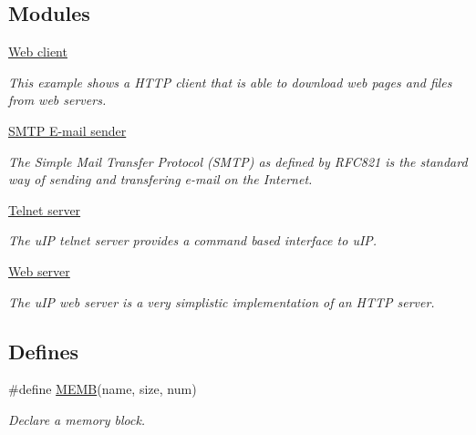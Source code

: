 \subsection*{Modules}
\begin{CompactItemize}
\item 
\hyperlink{a00079}{Web client}
\begin{CompactList}\small\item\em This example shows a HTTP client that is able to download web pages and files from web servers. \item\end{CompactList}

\item 
\hyperlink{a00080}{SMTP E-mail sender}
\begin{CompactList}\small\item\em The Simple Mail Transfer Protocol (SMTP) as defined by RFC821 is the standard way of sending and transfering e-mail on the Internet. \item\end{CompactList}

\item 
\hyperlink{a00081}{Telnet server}
\begin{CompactList}\small\item\em The u\-IP telnet server provides a command based interface to u\-IP. \item\end{CompactList}

\item 
\hyperlink{a00082}{Web server}
\begin{CompactList}\small\item\em The u\-IP web server is a very simplistic implementation of an HTTP server. \item\end{CompactList}

\end{CompactItemize}
\subsection*{Defines}
\begin{CompactItemize}
\item 
\#define \hyperlink{a00060_g8457539d6a6eaecded820f4042b8314a}{MEMB}(name, size, num)
\begin{CompactList}\small\item\em Declare a memory block. \item\end{CompactList}\end{CompactItemize}

